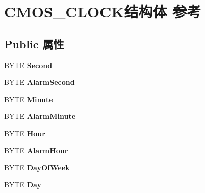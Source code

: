 \hypertarget{struct_c_m_o_s___c_l_o_c_k}{}\section{C\+M\+O\+S\+\_\+\+C\+L\+O\+C\+K结构体 参考}
\label{struct_c_m_o_s___c_l_o_c_k}
\subsection*{Public 属性}
\begin{DoxyCompactItemize}
\item 
\mbox{\label{struct_c_m_o_s___c_l_o_c_k_a828a682a0f45f28f7fdd14b544d25e1e}} 
B\+Y\+TE {\bfseries Second}
\item 
\mbox{\label{struct_c_m_o_s___c_l_o_c_k_a7eb87e68fa56d38c142961358bcc9353}} 
B\+Y\+TE {\bfseries Alarm\+Second}
\item 
\mbox{\label{struct_c_m_o_s___c_l_o_c_k_af7ffae763155a88fe7d0b9d6b0ac8761}} 
B\+Y\+TE {\bfseries Minute}
\item 
\mbox{\label{struct_c_m_o_s___c_l_o_c_k_ad546d0d93f6d84f085564771150d9590}} 
B\+Y\+TE {\bfseries Alarm\+Minute}
\item 
\mbox{\label{struct_c_m_o_s___c_l_o_c_k_a5ea3fad011e38b7625e2c1bd2049cb32}} 
B\+Y\+TE {\bfseries Hour}
\item 
\mbox{\label{struct_c_m_o_s___c_l_o_c_k_aa61d37f595358a9260491943e7989382}} 
B\+Y\+TE {\bfseries Alarm\+Hour}
\item 
\mbox{\label{struct_c_m_o_s___c_l_o_c_k_af97e58500294b56811b7a7e5a434c701}} 
B\+Y\+TE {\bfseries Day\+Of\+Week}
\item 
\mbox{\label{struct_c_m_o_s___c_l_o_c_k_a34f9b9f40c5a8c1c660e986d0ced641d}} 
B\+Y\+TE {\bfseries Day}
\item 
\mbox{\label{struct_c_m_o_s___c_l_o_c_k_a469102fbd55e492155c6bdf97ba58531}} 

\end{DoxyCompactItemize}
